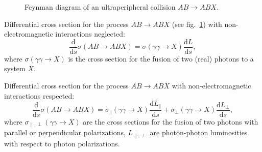 \documentclass[a4paper,12pt]{article}
\begin{document}
\begin{figure}[tbh]
  \centering
  \caption{Feynman diagram of an ultraperipheral collision $AB \to ABX$.}
  \label{f:upc}
\end{figure}
Differential cross section for the process $AB \to ABX$ (see fig.~\ref{f:upc})
with non-electromagnetic interactions neglected:
\begin{equation}
  \frac{\mathrm{d}}{\mathrm{d} s} \sigma(AB \to ABX)
  = \sigma(\gamma \gamma \to X) \frac{\mathrm{d} L}{\mathrm{d} s},
\end{equation}
where $\sigma(\gamma \gamma \to X)$ is the cross section for the fusion of two
(real) photons to a system $X$.

Differential cross section for the process $AB \to ABX$ with non-electromagnetic
interactions respected:
\begin{equation}
  \frac{\mathrm{d}}{\mathrm{d} s} \sigma(AB \to ABX)
  = \sigma_\parallel(\gamma \gamma \to X)
    \frac{\mathrm{d} L_\parallel}{\mathrm{d} s}
  + \sigma_\perp(\gamma \gamma \to X)
    \frac{\mathrm{d} L_\perp}{\mathrm{d} s},
\end{equation}
where $\sigma_{\parallel,\perp}(\gamma \gamma \to X)$ are the cross sections for
the fusion of two photons with parallel or perpendicular polarizations,
$L_{\parallel,\perp}$ are photon-photon luminosities with respect to photon
polarizations.
\end{document}
